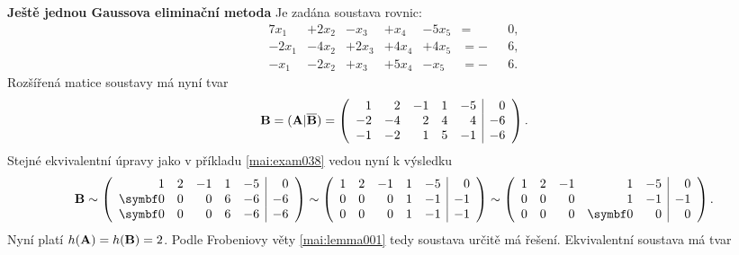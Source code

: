 \wikitextrule
\begin{example}\label{mai:exam039}
  \textbf{Ještě jednou Gaussova eliminační metoda}\newline\small
  Je zadána soustava rovnic:
  \begin{alignat*}{7}
      x_1 &+ 2x_2 &-  x_3 &+  x_4 &- 5x_5 &=  &&0, \\
    -2x_1 &- 4x_2 &+ 2x_3 &+ 4x_4 &+ 4x_5 &= -&&6, \\
     -x_1 &- 2x_2 &+  x_3 &+ 5x_4 &-  x_5 &= -&&6.
  \end{alignat*}
  Rozšířená matice soustavy má nyní tvar 
  \begin{equation*}
    \mathbf{B} = (\mathbf{A}|\overline{\mathbf{B}}) =
    \left(
      \begin{array}{rrrrr|r}
         1 &  2 & -1 & 1 & -5 &  0    \\
        -2 & -4 &  2 & 4 &  4 & -6    \\
        -1 & -2 &  1 & 5 & -1 & -6
      \end{array}
    \right).
  \end{equation*}
  Stejné ekvivalentní úpravy jako v příkladu \ref{mai:exam038} vedou nyní k výsledku
  \begin{gather*}
    \matr{B} \sim
    \left(
      \begin{array}{rrrrr|r}
         1 &  2 & -1 & 1 & -5 &  0         \\
         \bm{0} &  0 &  0 & 6 & -6 & -6    \\
         \bm{0} &  0 &  0 & 6 & -6 & -6
      \end{array}
    \right) \sim
    \left(
      \begin{array}{rrrrr|r}
              1 &  2 & -1 & 1 & -5 &  0    \\
              0 &  0 &  0 & 1 & -1 & -1    \\
              0 &  0 &  0 & 1 & -1 & -1
      \end{array}
    \right) \sim
    \left(
      \begin{array}{rrrrr|r}
              1 &  2 & -1 & 1      & -5 &  0    \\
              0 &  0 &  0 & 1      & -1 & -1    \\
              0 &  0 &  0 & \bm{0} &  0 &  0
      \end{array}
    \right).
  \end{gather*}
  Nyní platí \(h(\mathbf{A}) = h(\mathbf{B}) = 2\). Podle Frobeniovy věty \ref{mai:lemma001} tedy 
  soustava určitě má řešení. Ekvivalentní soustava má tvar

\end{example}
